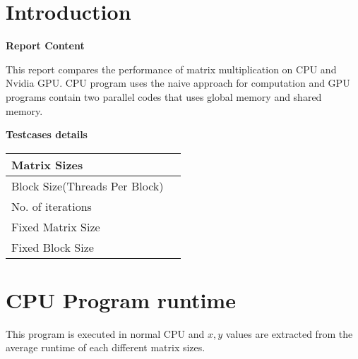 \documentclass[12pt]{article}
\title{\titlefont{Matrix Multiplication Runtime}}
\author{M.A.S SURANGA (CST140043)}
\date{}
\begin{document}
	\maketitle

	\vspace*{5\baselineskip} 
	\begin{center}
	\end{center}

	\newpage

	\tableofcontents

	\newpage
	\section{Introduction}
	\hfill \break

	\textbf{Report Content}

	\hfill \break

	This report compares the performance of matrix multiplication on CPU and Nvidia GPU. CPU program uses the naive approach for computation and GPU programs contain two parallel codes that uses global memory and shared memory.  

	\hfill \break

	\textbf{Testcases details}

	\hfill \break


	\begin{tabu} to 1 \textwidth { | X[l] | X[r] | }
		 \hline
		 Matrix Sizes &   \\
		 \hline
		 Block Size(Threads Per Block) &   \\
		 \hline
		 No. of iterations &   \\
		 \hline
		 Fixed Matrix Size &   \\
		 \hline
		 Fixed Block Size &   \\ 
		 \hline
	\end{tabu}	
	

	\newpage

	\section{CPU Program runtime}

	\par
	This program is executed in normal CPU and $x,y$ values are extracted from the average runtime of each different matrix sizes.
	\hfill \break
\end{document}
